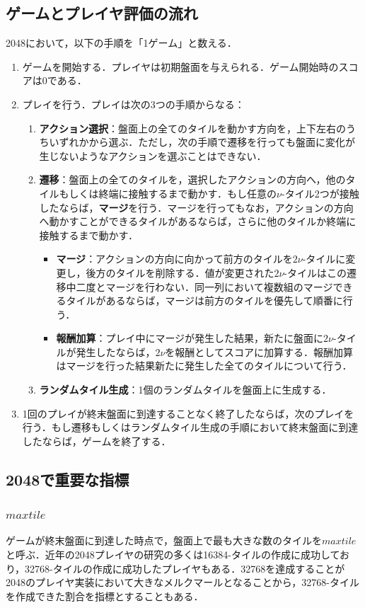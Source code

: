 \documentclass{suribt}
\begin{document}
\subsection{ゲームとプレイヤ評価の流れ}
2048において，以下の手順を「1ゲーム」と数える．

\begin{enumerate}
\item ゲームを開始する．プレイヤは初期盤面を与えられる．ゲーム開始時のスコアは0である．
\item プレイを行う．プレイは次の3つの手順からなる：
	\begin{enumerate}
	\item \textbf{アクション選択}：盤面上の全てのタイルを動かす方向を，上下左右のうちいずれかから選ぶ．ただし，次の手順で遷移を行っても盤面に変化が生じないようなアクションを選ぶことはできない．
	\item \textbf{遷移}：盤面上の全てのタイルを，選択したアクションの方向へ，他のタイルもしくは終端に接触するまで動かす．もし任意の${\nu}$-タイル2つが接触したならば，\textbf{マージ}を行う．マージを行ってもなお，アクションの方向へ動かすことができるタイルがあるならば，さらに他のタイルか終端に接触するまで動かす．
	\begin{itemize}
		\item \textbf{マージ}：アクションの方向に向かって前方のタイルを$2{\nu}$-タイルに変更し，後方のタイルを削除する．値が変更された$2{\nu}$-タイルはこの遷移中二度とマージを行わない．同一列において複数組のマージできるタイルがあるならば，マージは前方のタイルを優先して順番に行う．
		\item \textbf{報酬加算}：プレイ中にマージが発生した結果，新たに盤面に$2{\nu}$-タイルが発生したならば，$2{\nu}$を報酬としてスコアに加算する．報酬加算はマージを行った結果新たに発生した全てのタイルについて行う．
	\end{itemize}
	\item \textbf{ランダムタイル生成}：1個のランダムタイルを盤面上に生成する．
	\end{enumerate}
\item 1回のプレイが終末盤面に到達することなく終了したならば，次のプレイを行う．もし遷移もしくはランダムタイル生成の手順において終末盤面に到達したならば，ゲームを終了する．
\end{enumerate}

\subsection{2048で重要な指標}
\subsubsection{$max tile$}
ゲームが終末盤面に到達した時点で，盤面上で最も大きな数のタイルを$max tile$と呼ぶ．近年の2048プレイヤの研究の多くは16384-タイルの作成に成功しており，32768-タイルの作成に成功したプレイヤもある．\cite{Jaskowski}32768を達成することが2048のプレイヤ実装において大きなメルクマールとなることから，32768-タイルを作成できた割合を指標とすることもある．\cite{Jaskowski}
\end{document}
